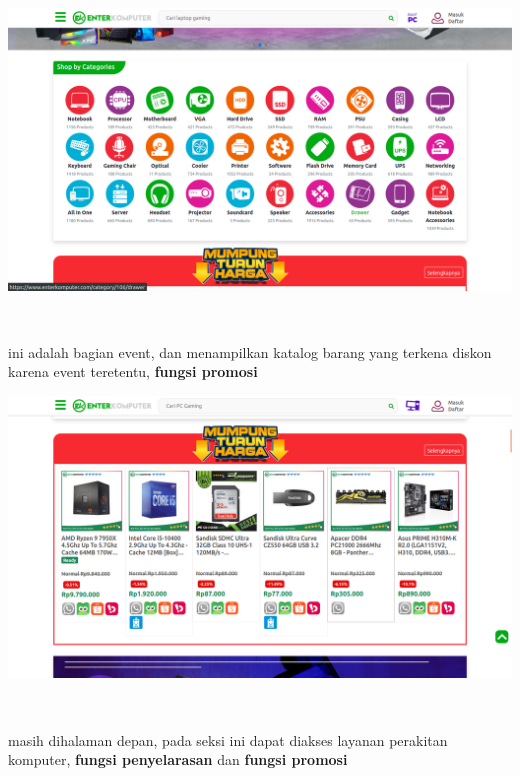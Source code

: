 \documentclass{article}
\begin{document}
\hspace*{0.04\textwidth}
\begin{minipage}{0.65\textwidth}
    \includegraphics[width=\textwidth]{file-33.png}
\end{minipage}
\\
\begin{minipage}{0.30\textwidth}
    ini adalah bagian event, dan menampilkan katalog barang yang terkena diskon karena event teretentu, \textbf{fungsi promosi}
\end{minipage}
\hspace*{0.04\textwidth}
\begin{minipage}{0.65\textwidth}
    \includegraphics[width=\textwidth]{file-32.png}
\end{minipage}
\\
\begin{minipage}{0.30\textwidth}
    masih dihalaman depan, pada seksi ini dapat diakses layanan perakitan komputer, \textbf{fungsi penyelarasan} dan \textbf{fungsi promosi}
\end{minipage}
\hspace*{0.04\textwidth}
\end{document}

